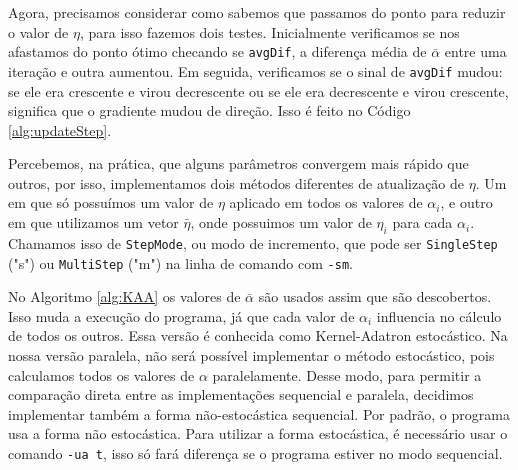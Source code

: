 Agora, precisamos considerar como sabemos que passamos do ponto para reduzir o valor de $\eta$, para isso fazemos dois testes. Inicialmente verificamos se nos afastamos do ponto ótimo checando se \texttt{avgDif}, a diferença média de $\bar{\alpha}$ entre uma iteração e outra aumentou. Em seguida, verificamos se o sinal de \texttt{avgDif} mudou: se ele era crescente e virou decrescente ou se ele era decrescente e virou crescente, significa que o gradiente mudou de direção. Isso é feito no Código \ref{alg:updateStep}.


Percebemos, na prática, que alguns parâmetros convergem mais rápido que outros, por isso, implementamos dois métodos diferentes de atualização de $\eta$. Um em que só possuímos um valor de $\eta$ aplicado em todos os valores de $\alpha_i$, e outro em que utilizamos um vetor $\bar{\eta}$, onde possuimos um valor de $\eta_i$ para cada $\alpha_i$. Chamamos isso de \texttt{StepMode}, ou modo de incremento, que pode ser \texttt{SingleStep} ("s") ou \texttt{MultiStep} ("m") na linha de comando com \texttt{-sm}.

No Algoritmo \ref{alg:KAA} os valores de $\bar{\alpha}$ são usados assim que são descobertos. Isso muda a execução do programa, já que cada valor de $\alpha_i$ influencia no cálculo de todos os outros. Essa versão é conhecida como Kernel-Adatron estocástico. Na nossa versão paralela, não será possível implementar o método estocástico, pois calculamos todos os valores de $\alpha$ paralelamente.
Desse modo, para permitir a comparação direta entre as implementações sequencial e paralela, decidimos implementar também a forma não-estocástica sequencial.
Por padrão, o programa usa a forma não estocástica. Para utilizar a forma estocástica, é necessário usar o comando \texttt{-ua t}, isso só fará diferença se o programa estiver no modo sequencial.

